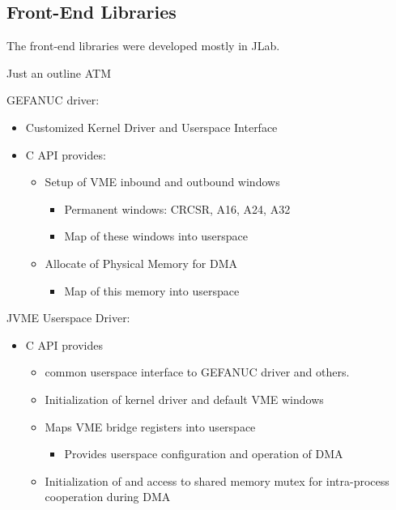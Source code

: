 \subsection{Front-End Libraries}

The front-end libraries were developed mostly in JLab.

Just an outline ATM

GEFANUC driver:
\begin{itemize}
\item Customized Kernel Driver and Userspace Interface
\item C API provides:
   \begin{itemize}
   \item Setup of VME inbound and outbound windows
      \begin{itemize}
      \item Permanent windows: CRCSR, A16, A24, A32
      \item Map of these windows into userspace
      \end{itemize}
   \item Allocate of Physical Memory for DMA
      \begin{itemize}
      \item Map of this memory into userspace
      \end{itemize}
   \end{itemize}
\end{itemize}

JVME Userspace Driver:
\begin{itemize}
\item C API provides
  \begin{itemize}
  \item common userspace interface to GEFANUC driver and others.
  \item Initialization of kernel driver and default VME windows
  \item Maps VME bridge registers into userspace
    \begin{itemize}
    \item Provides userspace configuration and operation of DMA
    \end{itemize}
  \item Initialization of and access to shared memory mutex for intra-process cooperation during DMA
  \end{itemize}
\end{itemize}

